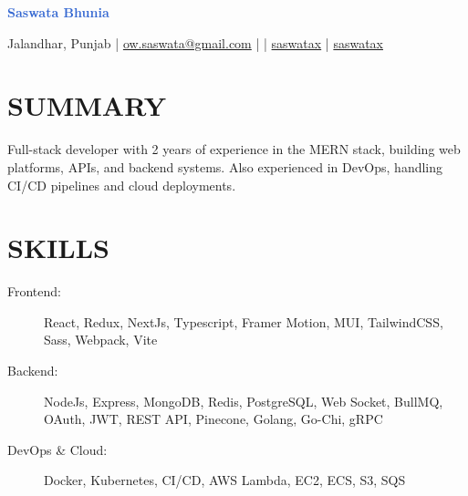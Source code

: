 \documentclass[]{resume}
\begin{document}
\textrm{\Huge\textcolor{highlight}{\textbf{Saswata Bhunia}}}
\vspace{.4em}

Jalandhar, Punjab | \href{mailto:ow.saswata@gmail.com}{\faEnvelope \space ow.saswata@gmail.com} | \faPhone {} | \href{https://www.linkedin.com/in/saswatax}{\faLinkedin \space saswatax} | \href{https://github.com/saswatax}{\faGithub \space saswatax}
\vspace{.4em}

\section{SUMMARY}
Full-stack developer with 2 years of experience in the MERN stack, building web platforms, APIs, and backend systems. Also experienced in DevOps, handling CI/CD pipelines and cloud deployments.

\section{SKILLS}
\begin{description}
  \item[Frontend:] React, Redux, NextJs, Typescript, Framer Motion, MUI, TailwindCSS, Sass, Webpack, Vite
  \item[Backend:] NodeJs, Express, MongoDB, Redis, PostgreSQL, Web Socket, BullMQ, OAuth, JWT, REST API, Pinecone, Golang, Go-Chi, gRPC
  \item[DevOps \& Cloud:] Docker, Kubernetes, CI/CD, AWS Lambda, EC2, ECS, S3, SQS
\end{description}
\end{document}
